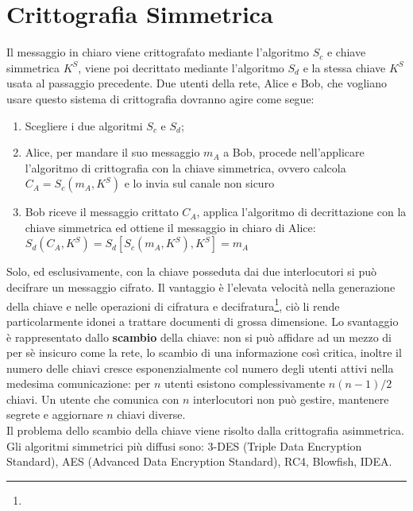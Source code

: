 \documentclass[a4paper,12pt]{tesiinfo}
\renewcommand{\footnotesize}{\fontsize{9pt}{11pt}\selectfont}
\begin{document}
\section{Crittografia Simmetrica}
Il messaggio in chiaro viene crittografato mediante l'algoritmo $S_c$ e chiave simmetrica $K^S$, viene poi decrittato mediante l'algoritmo $S_d$ e la stessa chiave $K^S$ usata al passaggio precedente. Due utenti della rete, Alice e Bob, che vogliano usare questo sistema di crittografia dovranno agire come segue: 
\begin{enumerate}
 \item Scegliere i due algoritmi $S_c$ e $S_d$;
 \item Alice, per mandare il suo messaggio $m_A$ a Bob, procede nell'applicare l'algoritmo di crittografia con la chiave simmetrica, ovvero calcola $C_A = S_c(m_A, K^S)$ e lo invia sul canale non sicuro
 \item Bob riceve il messaggio crittato $C_A$, applica l'algoritmo di decrittazione con la chiave simmetrica ed ottiene il messaggio in chiaro di Alice: $S_d(C_A, K^S) = S_d[S_c(m_A, K^S), K^S] = m_A$
\end{enumerate}
Solo, ed esclusivamente, con la chiave posseduta dai due interlocutori si pu\`o decifrare un messaggio cifrato. Il vantaggio \`e l'elevata velocit\`a nella generazione della chiave e nelle operazioni di cifratura e decifratura\footnote{\footnotesize{Le operazioni base, XOR, permutazioni, sostituzioni e shift di bit, sono tipicamente di basso livello e quindi molto veloci}}, ci\`o li rende particolarmente idonei a trattare documenti di grossa dimensione. Lo svantaggio \`e rappresentato dallo \textbf{scambio} della chiave: non si pu\`o affidare ad un mezzo di per s\`e insicuro come la rete, lo scambio di una informazione cos\`i critica, inoltre il numero delle chiavi cresce esponenzialmente col numero degli utenti attivi nella medesima comunicazione: per $n$ utenti esistono complessivamente $n(n-1) \big /2$ chiavi. Un utente che comunica con $n$ interlocutori non pu\`o gestire, mantenere segrete e aggiornare $n$ chiavi diverse. 
\\
Il problema dello scambio della chiave viene risolto dalla crittografia asimmetrica.
\\
Gli algoritmi simmetrici pi\`u diffusi sono: 3-DES (Triple Data Encryption Standard), AES (Advanced Data Encryption Standard), RC4, Blowfish, IDEA.
\\
\end{document}
